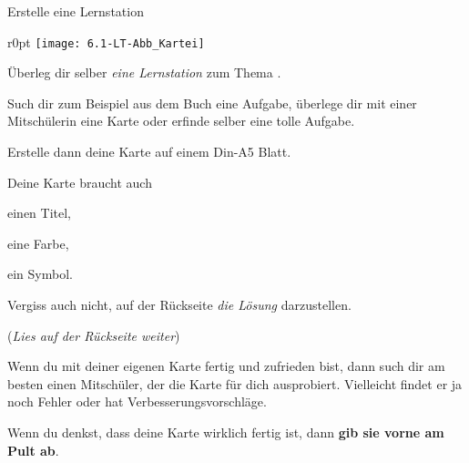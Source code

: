 \documentclass[12pt,a5paper,landscape]{scrartcl}
\begin{document}
	\begin{karte3}[\symPartner]{Erstelle eine Lernstation}
		\bigskip
			
		\begin{wrapfigure}{r}{0pt}
			\texttt{[image: 6.1-LT-Abb\_Kartei]}
		\end{wrapfigure}
		Überleg dir selber \emph{eine Lernstation} zum Thema \emph{\Titel}.
		
		Such dir zum Beispiel aus dem Buch eine Aufgabe, überlege dir mit einer Mitschülerin eine Karte oder erfinde selber eine tolle Aufgabe.
		
		Erstelle dann deine Karte auf einem Din-A5 Blatt.
		
		Deine Karte braucht auch
		\begin{smallitemize}
			\item einen Titel,
			\item eine Farbe,
			\item ein Symbol.
		\end{smallitemize}
		
		Vergiss auch nicht, auf der Rückseite \emph{die Lösung} darzustellen.
		
		\bigskip
		(\textit{Lies auf der Rückseite weiter})

	\end{karte3}
	
	\begin{loesungskarte}
		Wenn du mit deiner eigenen Karte fertig und zufrieden bist, dann such dir am besten einen Mitschüler, der die Karte für dich ausprobiert. Vielleicht findet er ja noch Fehler oder hat Verbesserungsvorschläge.
		
		\bigskip
		Wenn du denkst, dass deine Karte wirklich fertig ist, dann \textbf{gib sie vorne am Pult ab}.
	\end{loesungskarte}
	
\end{document}
